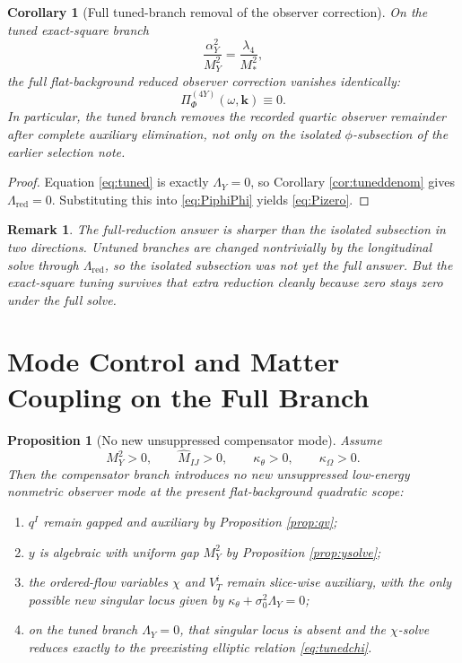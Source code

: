 \documentclass[11pt]{article}
\newtheorem{proposition}{Proposition}
\newtheorem{remark}{Remark}
\newtheorem{corollary}{Corollary}
\begin{document}
\begin{corollary}[Full tuned-branch removal of the observer correction]
\label{cor:tunedfull}
On the tuned exact-square branch
\begin{equation}
\frac{\alpha_Y^2}{M_Y^2}=\frac{\lambda_4}{M_*^2},
\label{eq:tuned}
\end{equation}
the full flat-background reduced observer correction vanishes identically:
\begin{equation}
\Pi_{\Phi}^{(4Y)}(\omega,\mathbf{k})\equiv 0.
\label{eq:Pizero}
\end{equation}
In particular, the tuned branch removes the recorded quartic observer remainder after \emph{complete} auxiliary elimination, not only on the isolated \(\phi\)-subsection of the earlier selection note.
\end{corollary}

\begin{proof}
Equation \eqref{eq:tuned} is exactly \(\Lambda_Y=0\), so Corollary \ref{cor:tuneddenom} gives \(\Lambda_{\mathrm{red}}=0\). Substituting this into \eqref{eq:PiphiPhi} yields \eqref{eq:Pizero}.
\end{proof}

\begin{remark}
The full-reduction answer is sharper than the isolated subsection in two directions. Untuned branches are changed nontrivially by the longitudinal solve through \(\Lambda_{\mathrm{red}}\), so the isolated subsection was not yet the full answer. But the exact-square tuning survives that extra reduction cleanly because zero stays zero under the full solve.
\end{remark}

\section{Mode Control and Matter Coupling on the Full Branch}

\begin{proposition}[No new unsuppressed compensator mode]
\label{prop:nolowmode}
Assume
\begin{equation}
M_Y^2>0,
\qquad
\widehat M_{IJ}>0,
\qquad
\kappa_\theta>0,
\qquad
\kappa_\Omega>0.
\label{eq:strictaux}
\end{equation}
Then the compensator branch introduces no new unsuppressed low-energy nonmetric observer mode at the present flat-background quadratic scope:
\begin{enumerate}
    \item \(q^I\) remain gapped and auxiliary by Proposition \ref{prop:qv};
    \item \(y\) is algebraic with uniform gap \(M_Y^2\) by Proposition \ref{prop:ysolve};
    \item the ordered-flow variables \(\chi\) and \(V_T^i\) remain slice-wise auxiliary, with the only possible new singular locus given by \(\kappa_\theta+\sigma_0^2\Lambda_Y=0\);
    \item on the tuned branch \(\Lambda_Y=0\), that singular locus is absent and the \(\chi\)-solve reduces exactly to the preexisting elliptic relation \eqref{eq:tunedchi}.
\end{enumerate}
\end{proposition}
\end{document}
